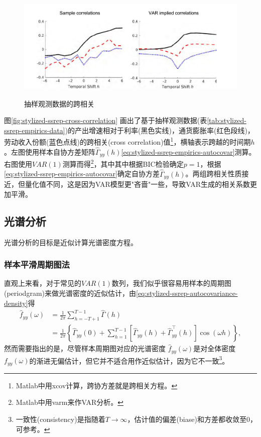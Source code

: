 \begin{figure}[htbp]
  \caption{抽样观测数据的跨相关}
  \centering
  \includegraphics[width=12cm]{./Figures/20180404-corss-correlations}
  \label{fig:stylized-ssrep-cross-correlation}
%
\end{figure}

图\eqref{fig:stylized-ssrep-cross-correlation}
画出了基于抽样观测数据(表\ref{tab:stylized-ssrep-empirics-data})的产出增速相对于利率(黑色实线)，通货膨胀率(红色段线)，劳动收入份额(蓝色点线)的跨相关(cross correlation)值\footnote{Matlab中用xcov计算，跨协方差就是跨相关方程。}，横轴表示跨越的时间期$h$。左图使用样本自协方差矩阵$\widehat{\Gamma}_{yy} \left( h \right)$\eqref{eq:stylized-ssrep-empirics-autocovar}测算。右图使用$VAR(1)$测算而得\footnote{Matlab中用varm来作VAR分析。}，其中其中根据BIC检验确定$p=1$，根据\eqref{eq:stylized-ssrep-empirics-autocovar}确定自协方差$\widehat{\Gamma}_{yy} \left( h \right)$。两组跨相关性质接近，但量化值不同，这是因为VAR模型更"吝啬"一些，导致VAR生成的相关系数更加平滑。

\subsection{光谱分析}
\label{sec:stylized-ssrep-empirics-spectral}
光谱分析的目标是近似计算光谱密度方程。
\subsubsection{样本平滑周期图法}
\label{sec:stylized-ssrep-empirics-spectral-direct}
直观上来看，对于常见的$VAR(1)$数列，我们似乎很容易用样本的周期图(periodgram)来做光谱密度的近似估计，由\eqref{eq:stylized-ssrep-autocovariance-density}得
\begin{equation}
  \label{eq:spectral-periodgram-def}
\begin{split}
  \hat{f}_{yy} \left( \omega \right)
  & = \frac{1}{2 \pi} \sum_{h=-T+1}^{T-1} \widehat{\Gamma} \left( h \right)  \\
  & = \frac{1}{ 2 \pi}
  \left\{
  \widehat{\Gamma}_{yy} \left( 0 \right)
  + \sum_{h=1}^{T-1}
  \left[
  \widehat{\Gamma}_{yy} \left( h \right)
  + \widehat{\Gamma}_{yy}^{\top} \left( h \right)
  \right]
  \cos \left( \omega h \right)
  \right\},
\end{split}
\end{equation}
然而需要指出的是，尽管样本周期图对应的光谱密度 $\hat{f}_{yy} \left( \omega \right)$是对全体密度$f_{yy} \left( \omega \right)$的渐进无偏估计，但它并不适合用作近似估计，因为它不一致\footnote{
一致性(consistency)是指随着$T \rightarrow \infty$，估计值的偏差(biase)和方差都收敛至$0$，可参考\cite[Sec. 8.2]{Koopmans:1995vn}。}。

